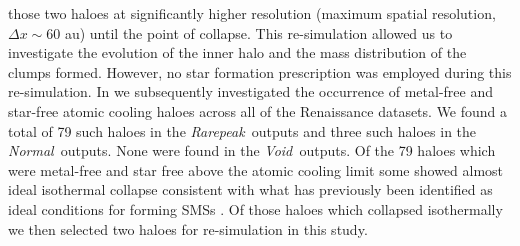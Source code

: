 \documentclass[graphics, twocolumn, usenatbib]{mn2e}
\newcommand{\rarepeak} {\textit{Rarepeak~}}
\newcommand{\normal} {\textit{Normal~}}
\newcommand{\void} {\textit{Void~}}
\begin{document}
 those two haloes at significantly higher resolution (maximum spatial resolution,
 $\Delta x \sim 60$ au) until the point of collapse. This re-simulation allowed us to investigate
 the evolution of the inner halo and the mass distribution of the clumps formed. However, no star
 formation prescription was employed during this re-simulation. In \cite{Regan_2020} we subsequently
 investigated the occurrence of metal-free and star-free atomic cooling haloes across all of the
 Renaissance datasets. We found a total of 79 such haloes in the
 \rarepeak outputs and three such haloes in the \normal outputs. None were found in the \void outputs.
 Of the 79 haloes which were metal-free and star free above the atomic cooling limit some
 showed almost ideal isothermal collapse consistent with what has previously been identified
 as ideal conditions for forming SMSs \citep{Inayoshi_2014, Becerra_2015, Latif_2016a,
   Regan_2017, Chon_2017b, Regan_2018b}. Of those haloes which collapsed isothermally we then
 selected two haloes for re-simulation in this study. \\
\end{document}
